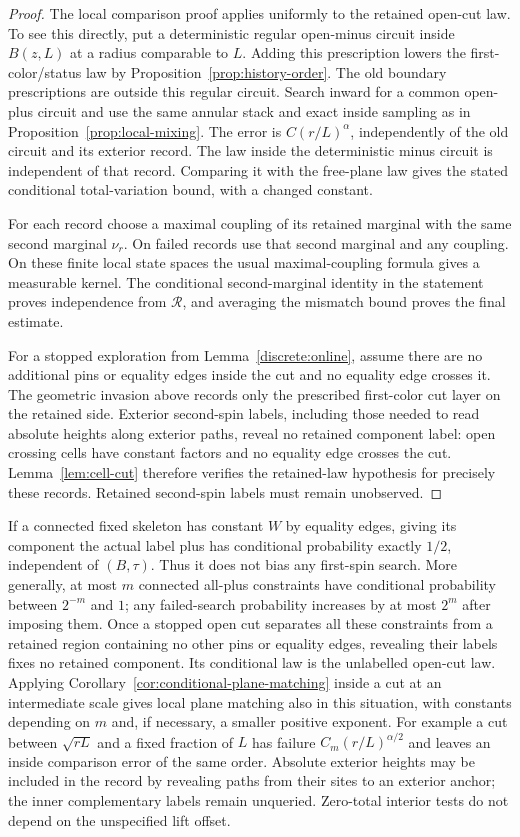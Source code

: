 \begin{proof}
The local comparison proof applies uniformly to the retained open-cut law.
To see this directly, put a deterministic regular open-minus circuit inside
$B(z,L)$ at a radius comparable to $L$.  Adding this prescription lowers
the first-color/status law by Proposition~\ref{prop:history-order}.
The old boundary prescriptions are outside this regular circuit.  Search
inward for a common open-plus circuit and use the same annular stack and
exact inside sampling as in Proposition~\ref{prop:local-mixing}.  The error
is $C(r/L)^\alpha$, independently of the old circuit and its exterior
record.  The law inside the deterministic minus circuit is independent of
that record.  Comparing it with the free-plane law gives the stated
conditional total-variation bound, with a changed constant.

For each record choose a maximal coupling of its retained marginal with
the same second marginal $\nu_r$.  On failed records use that second
marginal and any coupling.  On these finite local state spaces the usual
maximal-coupling formula gives a measurable kernel.  The conditional
second-marginal identity in the statement proves independence from
$\mathcal R$, and averaging the mismatch bound proves the final estimate.

For a stopped exploration from Lemma~\ref{discrete:online}, assume there
are no additional pins or equality edges inside the cut and no equality
edge crosses it.  The geometric invasion above records only the prescribed first-color cut layer on the
retained side.  Exterior second-spin labels, including those needed to
read absolute heights along exterior paths, reveal no retained component
label: open crossing cells have constant factors and no equality edge
crosses the cut.  Lemma~\ref{lem:cell-cut} therefore verifies the retained-law
hypothesis for precisely these records.  Retained second-spin labels must
remain unobserved.
\end{proof}

If a connected fixed skeleton has constant $W$ by equality edges, giving
its component the actual label plus has conditional probability exactly
$1/2$, independent of $(B,\tau)$. Thus it does not bias any first-spin
search. More generally, at most $m$ connected all-plus constraints have
conditional probability between $2^{-m}$ and $1$; any failed-search
probability increases by at most $2^m$ after imposing them. Once a stopped
open cut separates all these constraints from a retained region containing
no other pins or equality edges, revealing their labels fixes no retained
component. Its conditional law
is the unlabelled open-cut law. Applying Corollary~\ref{cor:conditional-plane-matching}
inside a cut at an intermediate scale gives local plane
matching also in this situation, with constants depending on $m$ and,
if necessary, a smaller positive exponent. For example a cut between
$\sqrt{rL}$ and a fixed fraction of $L$ has failure
$C_m(r/L)^{\alpha/2}$ and leaves an inside comparison error of the same
order. Absolute exterior heights may be included in the record by
revealing paths from their sites to an exterior anchor; the inner
complementary labels remain unqueried. Zero-total interior tests do not depend on the unspecified lift offset.

